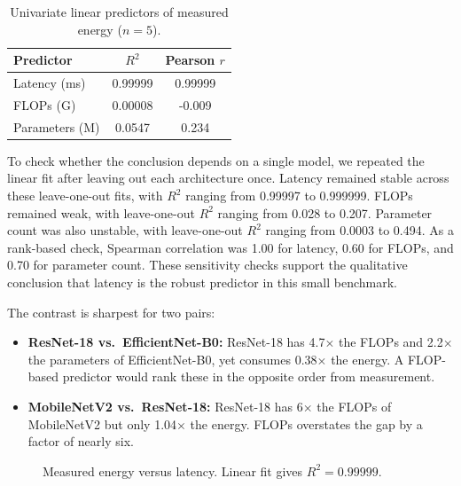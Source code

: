 \documentclass[conference]{IEEEtran}
\begin{document}
\begin{table}[ht]
\centering
\caption{Univariate linear predictors of measured energy ($n = 5$).}
\label{tab:predictors}
\begin{tabular}{l c c}
\toprule
Predictor & $R^2$ & Pearson $r$ \\
\midrule
Latency (ms) & 0.99999 & 0.99999 \\
FLOPs (G) & 0.00008 & -0.009 \\
Parameters (M) & 0.0547 & 0.234 \\
\bottomrule
\end{tabular}
\end{table}

To check whether the conclusion depends on a single model, we repeated the
linear fit after leaving out each architecture once. Latency remained stable
across these leave-one-out fits, with $R^2$ ranging from 0.99997 to 0.999999.
FLOPs remained weak, with leave-one-out $R^2$ ranging from 0.028 to 0.207.
Parameter count was also unstable, with leave-one-out $R^2$ ranging from
0.0003 to 0.494. As a rank-based check, Spearman correlation was 1.00 for
latency, 0.60 for FLOPs, and 0.70 for parameter count. These sensitivity
checks support the qualitative conclusion that latency is the robust predictor
in this small benchmark.

The contrast is sharpest for two pairs:
\begin{itemize}
\item \textbf{ResNet-18 vs.\ EfficientNet-B0:} ResNet-18 has 4.7$\times$ the
FLOPs and 2.2$\times$ the parameters of EfficientNet-B0, yet consumes
0.38$\times$ the energy. A FLOP-based predictor would rank these in the
opposite order from measurement.
\item \textbf{MobileNetV2 vs.\ ResNet-18:} ResNet-18 has 6$\times$ the FLOPs
of MobileNetV2 but only 1.04$\times$ the energy. FLOPs overstates the gap by a
factor of nearly six.
\end{itemize}

\begin{figure}[ht]
\centering
{}
\caption{Measured energy versus latency. Linear fit gives $R^2 = 0.99999$.}
\label{fig:energy-vs-latency}
\end{figure}
\end{document}
